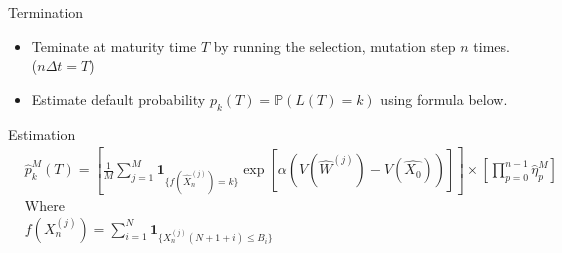 \begin{frame}{Termination}
	\begin{itemize}
		\item Teminate at maturity time $T$ by running the selection, mutation
		      step $n$ times. ($n \Delta t = T$)
		\item Estimate default probability $p_k(T) = \mathbb{P}\left( L\left( T \right) = k
		      \right)$ using formula below.
	\end{itemize}
	\begin{block}{Estimation}
		\begin{equation*}
			\begin{split}
				&\hat{p}_{k}^{M}(T) = \left[ \frac{1}{M} \sum_{j=1}^{M} \mathbf{1}_{\lbrace f(\hat{X}_{n}^{(j)}) = k\rbrace
						}\exp\left[{\alpha(V(\hat{W}^{(j)}) - V(\hat{X_{0}}))}\right]\right] \times \left[ \prod_{p=0}^{n-1} \hat{\eta}_{p}^{M}\right] \\
						&\text{Where}\\
						&f(X^{(j)}_n) = \sum_{i=1}^{N}\mathbf{1}_{\lbrace X^{(j)}_{n}(N + 1 + i)\leq B_{i}\rbrace}
					\end{split}
				\end{equation*}
			\end{block}
		\end{frame}

